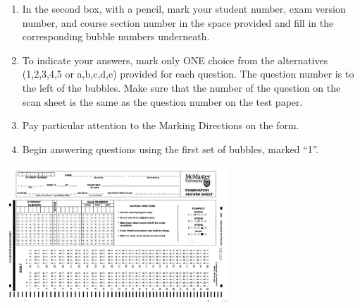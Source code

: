 {\begin{enumerate}
\item In the second box, with a pencil, mark your student number, exam version number, and course section number in the space provided and fill in the corresponding bubble numbers underneath.

\item To indicate your answers, mark only ONE choice from the alternatives (1,2,3,4,5 or a,b,c,d,e) provided for each question.  The question number is to the left of the bubbles.  Make sure that the number of the question on the scan sheet is the same as the question number on the test paper.

\item Pay particular attention to the Marking Directions on the form.

\item Begin answering questions using the first set of bubbles, marked ``1''.

\end{enumerate}

\includegraphics[height=2in]{scantron.jpg}

}


